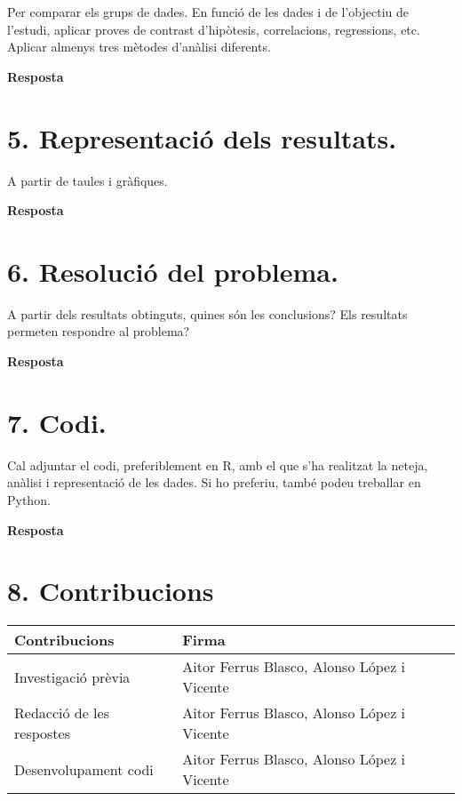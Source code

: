\documentclass[
]{article}
\begin{document}
Per comparar els grups de dades. En funció de les dades i de l'objectiu
de l'estudi, aplicar proves de contrast d'hipòtesis, correlacions,
regressions, etc. Aplicar almenys tres mètodes d'anàlisi diferents.

\textbf{Resposta}

\hypertarget{representaciuxf3-dels-resultats.}{%
\section{5. Representació dels
resultats.}\label{representaciuxf3-dels-resultats.}}

A partir de taules i gràfiques.

\textbf{Resposta}

\hypertarget{resoluciuxf3-del-problema.}{%
\section{6. Resolució del problema.}\label{resoluciuxf3-del-problema.}}

A partir dels resultats obtinguts, quines són les conclusions? Els
resultats permeten respondre al problema?

\textbf{Resposta}

\hypertarget{codi.}{%
\section{7. Codi.}\label{codi.}}

Cal adjuntar el codi, preferiblement en R, amb el que s'ha realitzat la
neteja, anàlisi i representació de les dades. Si ho preferiu, també
podeu treballar en Python.

\textbf{Resposta}

\hypertarget{contribucions}{%
\section{8. Contribucions}\label{contribucions}}

\begin{longtable}[]{@{}ll@{}}
\toprule
Contribucions & Firma\tabularnewline
\midrule
\endhead
Investigació prèvia & Aitor Ferrus Blasco, Alonso López i
Vicente\tabularnewline
Redacció de les respostes & Aitor Ferrus Blasco, Alonso López i
Vicente\tabularnewline
Desenvolupament codi & Aitor Ferrus Blasco, Alonso López i
Vicente\tabularnewline
\bottomrule
\end{longtable}
\end{document}
